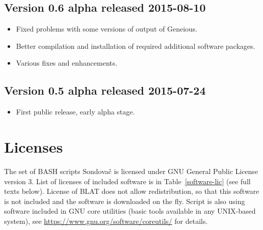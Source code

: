 \documentclass[a4paper, 11pt, twoside]{article}
\begin{document}
\subsection{Version 0.6 alpha released 2015-08-10}

\begin{itemize}
  \item Fixed problems with some versions of output of Geneious.
  \item Better compilation and installation of required additional software packages.
  \item Various fixes and enhancements.
\end{itemize}

\subsection{Version 0.5 alpha released 2015-07-24}

\begin{itemize}
  \item First public release, early alpha stage.
\end{itemize}

\section{Licenses}

The set of BASH scripts Sondovač is licensed under GNU General Public License version 3. List of licenses of included software is in Table~\ref{software-lic} (see full texts below). License of BLAT does not allow redistribution, so that this software is not included and the software is downloaded on the fly. Script is also using software included in GNU core utilities (basic tools available in any UNIX-based system), see \href{https://www.gnu.org/software/coreutils/}{https://www.gnu.org/software/coreutils/} for details.
\end{document}
